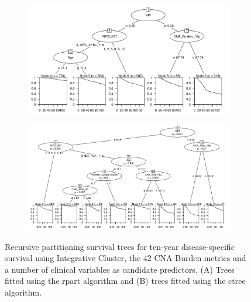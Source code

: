 \begin{figure}[!h]
\centering

\vspace{1cm}

\begin{subfigure}{\textwidth}
\subcaption{}
\includegraphics[width=1\textwidth]{../figures/Chapter_3/Clin_PA_PartyKit_Survival_Burden_TenYearDSS_INTCLUST.png}
\end{subfigure}

\vspace{2cm}

\begin{subfigure}{\textwidth}
\subcaption{}
\includegraphics[width=1\textwidth]{../figures/Chapter_3/Clin_PA_Ctree_Survival_Burden_TenYearDSS_INTCLUST.png}
\end{subfigure}

\vspace{1cm}

\caption[Recursive partitioning survival trees for ten-year disease-specific survival using Integrative Cluster, the 42 CNA Burden metrics and a number of clinical variables as candidate predictors.]{Recursive partitioning survival trees for ten-year disease-specific survival using Integrative Cluster, the 42 CNA Burden metrics and a number of clinical variables as candidate predictors. (A) Trees fitted using the rpart algorithm and (B) trees fitted using the ctree algorithm.}
\label{fig:PA_INTCLUST_CNA_Burden_TenYearDSS_Clin}
\end{figure}

